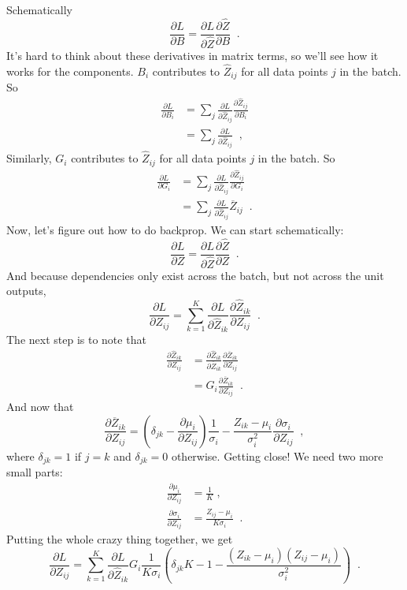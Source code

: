 Schematically
\[\frac{\partial L}{\partial B} = \frac{\partial L}{\partial
    \widehat{Z}}\frac{\partial \widehat{Z}}{\partial B}\;\;.\]
It's hard to think about these derivatives in matrix terms, so we'll
see how it works for the components.
$B_i$ contributes to $\widehat{Z}_{ij}$ for all data points $j$ in the
batch.  So
\begin{align*}
  \frac{\partial L}{\partial B_i} & =
  \sum_j \frac{\partial L}{\partial \widehat{Z}_{ij}}
  \frac{\partial \widehat{Z}_{ij}}{\partial B_i}                                               \\
                                  & = \sum_j \frac{\partial L}{\partial \widehat{Z}_{ij}}\;\;,
\end{align*}
Similarly, $G_i$ contributes to $\widehat{Z}_{ij}$ for all data points
$j$ in the batch.  So
\begin{align*}
  \frac{\partial L}{\partial G_i} & =
  \sum_j \frac{\partial L}{\partial \widehat{Z}_{ij}}
  \frac{\partial \widehat{Z}_{ij}}{\partial G_i}                                                                  \\
                                  & =  \sum_j \frac{\partial L}{\partial \widehat{Z}_{ij}} \overline{Z}_{ij}\;\;.
\end{align*}
Now, let's figure out how to do backprop.  We can start schematically:
\[\frac{\partial L}{\partial Z} = \frac{\partial L}{\partial \widehat{Z}}
  \frac{\partial \widehat{Z}}{\partial Z}\;\;.\]
And because dependencies only exist across the batch, but not across
the unit outputs,
\[\frac{\partial L}{\partial Z_{ij}} =
  \sum_{k=1}^K\frac{\partial L}{\partial \widehat{Z}_{ik}}
  \frac{\partial \widehat{Z}_{ik}}{\partial Z_{ij}}\;\;.\]
The next step is to note that
\begin{align*}
  \frac{\partial \widehat{Z}_{ik}}{\partial Z_{ij}} & =
  \frac{\partial \widehat{Z}_{ik}}{\partial \overline{Z}_{ik}}
  \frac{\partial \overline{Z}_{ik}}{\partial Z_{ij}}                                                                \\
                                                    & = G_i \frac{\partial \overline{Z}_{ik}}{\partial Z_{ij}}\;\;.
\end{align*}
And now that
\[
  \frac{\partial \overline{Z}_{ik}}{\partial Z_{ij}}  =
  \left(\delta_{jk} - \frac{\partial \mu_i}{\partial Z_{ij}}\right) \frac{1}{\sigma_i} -
  \frac{Z_{ik} - \mu_i}{\sigma_i^2} \frac{\partial \sigma_i}{\partial Z_{ij}} \;\;,
\]
where $\delta_{jk} = 1$ if $j = k$ and $\delta_{jk} = 0$ otherwise.
Getting close!  We need two more small parts:
\begin{align*}
  \frac{\partial \mu_i}{\partial Z_{ij}}    & = \frac{1}{K} \;, \\
  \frac{\partial \sigma_i}{\partial Z_{ij}} & =
  \frac{Z_{ij} - \mu_i}{K \sigma_i}\;\;.
\end{align*}
Putting the whole crazy thing together, we get
\[\frac{\partial L}{\partial Z_{ij}} =
  \sum_{k=1}^K\frac{\partial L}{\partial \widehat{Z}_{ik}}
  G_i\frac{1}{K \sigma_i}\left(\delta_{jk}K-1 - \frac{(Z_{ik} - \mu_i)(Z_{ij} - \mu_i)}{\sigma_i^2}
  \right)\;\;.
\]